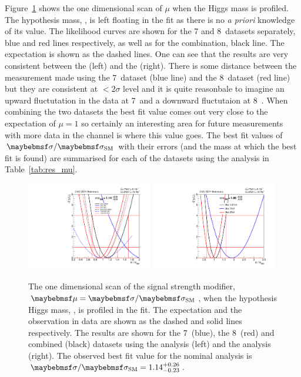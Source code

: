 Figure~\ref{fig:res_muscan} shows the one dimensional \NLL scan of $\mu$ when the Higgs mass \mH is profiled. The hypothesis mass, \mH, is left floating in the fit as there is no \textit{a priori} knowledge of its value. The likelihood curves are shown for the 7 and 8~\TeV datasets separately, blue and red lines respectively, as well as for the combination, black line. The \SM expectation is shown as the dashed lines. One can see that the results are very consistent between the \MFM (left) and the \SMVA (right). There is some distance between the measurement made using the 7~\TeV dataset (blue line) and the 8~\TeV dataset (red line) but they are consistent at $<2\sigma$ level and it is quite reasonbale to imagine an upward fluctutation in the data at 7~\TeV and a downward fluctutaion at 8~\TeV. When combining the two datasets the best fit value comes out very close to the \SM expectation of $\mu=1$ so certainly an interesting area for future measurements with more data in the \Hgg channel is where this value goes. The best fit values of $\musm$ with their errors (and the mass at which the best fit is found) are summarised for each of the datasets using the \MFM analysis in Table~\ref{tab:res_mu}.

\begin{figure}
  \includegraphics[width=0.49\textwidth]{ch5_anal_and_results/plots/results/obsmu.pdf}
  \includegraphics[width=0.49\textwidth]{ch5_anal_and_results/plots/results/obsmu_sideband.pdf}\\
  \caption{The one dimensional \NLL scan of the signal strength modifier, $\mu=\musm$, when the hypothesis Higgs mass, \mH, is profiled in the fit. The \SM expectation and the observation in data are shown as the dashed and solid lines respectively. The results are shown for the 7~\TeV (blue), the 8~\TeV (red) and combined (black) datasets using the \MFM analysis (left) and the \SMVA analysis (right). The observed best fit value for the nominal \MFM analysis is $\musm=1.14^{+0.26}_{-0.23}$.}
  \label{fig:res_muscan}
\end{figure}

